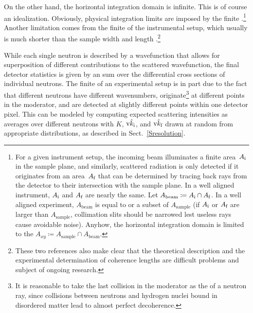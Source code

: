 On the other hand, the horizontal integration domain is infinite.
This is of course an idealization.
Obviously, physical integration limits are imposed by the finite
.\footnote
{For a given instrument setup,
the incoming beam illuminates a finite area~$A_{\text{i}}$ in the sample plane,
and similarly, scattered radiation is only detected if it originates
from an area~$A_{\text{f}}$ that can be determined
by tracing back rays from the detector
to their intersection with the sample plane.
In a well aligned instrument, $A_{\text{i}}$ and $A_{\text{f}}$ are nearly the same.
Let $A_\text{beam}\coloneqq A_{\text{i}}\cap A_{\text{f}}$.
In a well aligned experiment,
$A_\text{beam}$ is equal to or a subset of $A_\text{sample}$
(if $A_{\text{i}}$ or $A_{\text{f}}$ are larger than $A_\text{sample}$,
collimation slits should be narrowed
lest useless rays cause avoidable noise).
Anyhow, the horizontal integration domain
is limited to the 
$A_{xy}\coloneqq A_\text{sample}\cap A_\text{beam}$.}
%
%
Another limitation comes from the finite 
of the instrumental setup,
which usually is much shorter than the sample width and length
\cite{HaPR10,MaMM14}.\footnote
{These two references also make clear that
  the theoretical description and the experimental determination of
  coherence lengths are difficult problems and subject of ongoing research.}

While each single neutron is described by a wavefunction
that allows for  superposition of
different contributions to the scattered wavefunction,
the final detector statistics
%
is given by an  sum
over the differential cross sections of individual neutrons.
The finite 
%
of an experimental setup is in part due to the fact that
different neutrons have different wavenumbers,
originate\footnote
{It is reasonable to take the last collision in the moderator
  as the  of a neutron ray,
  since collisions between neutrons and hydrogen nuclei bound in
  disordered matter lead to almost perfect decoherence.}
at different points in the moderator,
and are detected at slightly different points within one detector pixel.
This can be modeled by computing expected scattering intensities as
averages over different neutrons with 
$K$, $\text{v}{\hat k}_{\text{i}}$, and $\text{v}{\hat k}_{\text{f}}$ drawn at random
from appropriate distributions,
as described in Sect.~\ref{Sresolution}.

